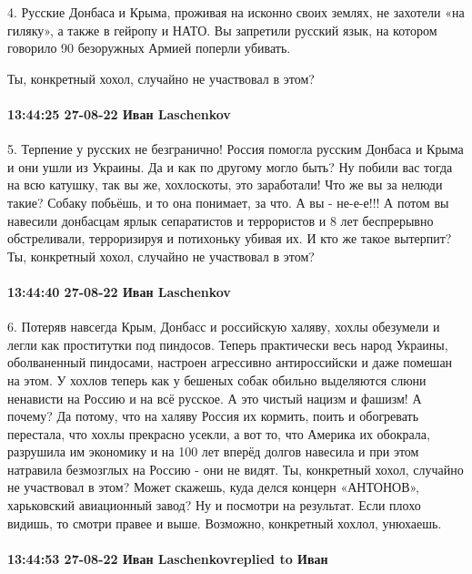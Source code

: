 4. Русские Донбаса и Крыма, проживая на исконно своих землях, не захотели «на
гиляку», а также в гейропу и НАТО. Вы запретили русский язык, на котором
говорило 90%
безоружных Армией поперли убивать.

Ты, конкретный хохол, случайно не участвовал в этом?

\paragraph{13:44:25 27-08-22 Иван Laschenkov}

5. Терпение у русских не безгранично! Россия помогла русским Донбаса и Крыма и они ушли из Украины. Да и как по другому могло быть?
Ну побили вас тогда на всю катушку, так вы же, хохлоскоты, это заработали! Что же вы за нелюди такие? Собаку побьёшь, и то она понимает, за что. А вы - не-е-е!!!
А потом вы навесили донбасцам ярлык сепаратистов и террористов и 8 лет беспрерывно обстреливали, терроризируя и потихоньку убивая их.
И кто же такое вытерпит?
Ты, конкретный хохол, случайно не участвовал в этом?

\paragraph{13:44:40 27-08-22 Иван Laschenkov}

6. Потеряв навсегда Крым, Донбасс и российскую халяву, хохлы обезумели и легли как проститутки под пиндосов.
Теперь практически весь народ Украины, оболваненный пиндосами, настроен агрессивно антироссийски и даже помешан на этом. У хохлов теперь как у бешеных собак обильно выделяются слюни ненависти на Россию и на всё русское. А это чистый нацизм и фашизм!
А почему?
Да потому, что на халяву Россия их кормить, поить и обогревать перестала, что хохлы прекрасно усекли, а вот то, что Америка их обокрала, разрушила им экономику и на 100 лет вперёд долгов навесила и при этом натравила безмозглых на Россию - они не видят.
Ты, конкретный хохол, случайно не участвовал в этом? Может скажешь, куда делся концерн «АНТОНОВ», харьковский авиационный завод?
Ну и посмотри на результат. Если плохо видишь, то смотри правее и выше. Возможно, конкретный хохлол, унюхаешь.

\paragraph{13:44:53 27-08-22 Иван Laschenkovreplied to Иван}

